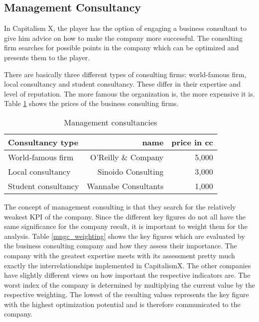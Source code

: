 \subsection{Management Consultancy} \label{management_consultancy_simulation}
In Capitalism X, the player has the option of engaging a business consultant to give him advice on how to make the company more successful. 
The consulting firm searches for possible points in the company which can be optimized and presents them to the player.

There are basically three different types of consulting firms: world-famous firm, local consultancy and student consultancy. These differ in their expertise and level of reputation. The more famous the organization is, the more expensive it is. Table \ref{mng_consultancy} shows the prices of the business consulting firms. 

\begin{table}[ht]
\centering
\begin{tabular}{|l|r|r|}
\hline
Consultancy type        & name  & price in cc \\ \hline
World-famous firm       & O'Reilly \& Company     & 5,000     \\
Local consultancy       & Sinoido Consulting     & 3,000     \\
Student consultancy     & Wannabe Consultants    & 1,000     \\
\hline
\end{tabular}
\caption{Management consultancies}
\label{mng_consultancy}
\end{table}

The concept of management consulting is that they search for the relatively weakest KPI of the company. Since the different key figures do not all have the same significance for the company result, it is important to weight them for the analysis.
Table \ref{mngc_weighting} shows the key figures which are evaluated by the business consulting company and how they assess their importance.
The company with the greatest expertise meets with its assessment pretty much exactly the interrelationships implemented in CapitalismX. The other companies have slightly different views on how important the respective indicators are. 
The worst index of the company is determined by multiplying the current value by the respective weighting. The lowest of the resulting values represents the key figure with the highest optimization potential and is therefore communicated to the company. 
 

